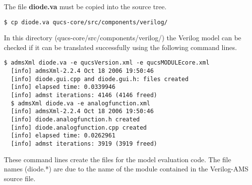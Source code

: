 \addvspace{12pt}

The file \textbf{diode.va} must be copied into the source tree.
\begin{Verbatim}[fontsize=\small]
  $ cp diode.va qucs-core/src/components/verilog/
\end{Verbatim}

In this directory (qucs-core/src/components/verilog/) the Verilog
model can be checked if it can be translated successfully using the
following command lines.
\begin{Verbatim}[fontsize=\small]
  $ admsXml diode.va -e qucsVersion.xml -e qucsMODULEcore.xml
  [info] admsXml-2.2.4 Oct 18 2006 19:50:46
  [info] diode.gui.cpp and diode.gui.h: files created
  [info] elapsed time: 0.0339946
  [info] admst iterations: 4146 (4146 freed)
  $ admsXml diode.va -e analogfunction.xml
  [info] admsXml-2.2.4 Oct 18 2006 19:50:46
  [info] diode.analogfunction.h created
  [info] diode.analogfunction.cpp created
  [info] elapsed time: 0.0262961
  [info] admst iterations: 3919 (3919 freed)
\end{Verbatim}

These command lines create the files for the model evaluation code.
The file names (diode.*) are due to the name of the module contained
in the Verilog-AMS source file.

\addvspace{12pt}

